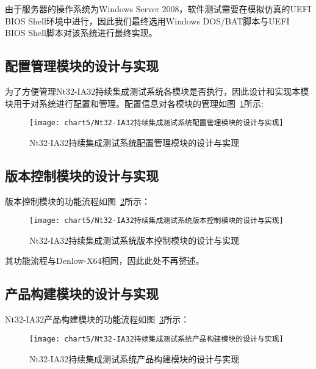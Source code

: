 	由于服务器的操作系统为Windows Server 2008，软件测试需要在模拟仿真的UEFI BIOS Shell环境中进行，因此我们最终选用Windows DOS/BAT脚本与UEFI BIOS Shell脚本对该系统进行最终实现。
		
	\subsection{配置管理模块的设计与实现}
		
		为了方便管理Nt32-IA32持续集成测试系统各模块是否执行，因此设计和实现本模块用于对系统进行配置和管理。配置信息对各模块的管理如图~\ref{fig:Nt32-IA32持续集成测试系统配置管理模块的设计与实现}所示:
	
		\begin{figure}[H] %
			\centering
			\texttt{[image: chart5/Nt32-IA32持续集成测试系统配置管理模块的设计与实现]}
			\caption{Nt32-IA32持续集成测试系统配置管理模块的设计与实现}
			\label{fig:Nt32-IA32持续集成测试系统配置管理模块的设计与实现}
		\end{figure}
	
	\subsection{版本控制模块的设计与实现}
		
		版本控制模块的功能流程如图~\ref{fig:Nt32-IA32持续集成测试系统版本控制模块的设计与实现}所示：
		
		\begin{figure}[H] %
			\centering
			\texttt{[image: chart5/Nt32-IA32持续集成测试系统版本控制模块的设计与实现]}
			\caption{Nt32-IA32持续集成测试系统版本控制模块的设计与实现}
			\label{fig:Nt32-IA32持续集成测试系统版本控制模块的设计与实现}
		\end{figure}

		其功能流程与Denlow-X64相同，因此此处不再赘述。
	
	\subsection{产品构建模块的设计与实现}
		
		Nt32-IA32产品构建模块的功能流程如图~\ref{fig:Nt32-IA32持续集成测试系统产品构建模块的设计与实现}所示：
		
		\begin{figure}[H] %
			\centering
			\texttt{[image: chart5/Nt32-IA32持续集成测试系统产品构建模块的设计与实现]}
			\caption{Nt32-IA32持续集成测试系统产品构建模块的设计与实现}
			\label{fig:Nt32-IA32持续集成测试系统产品构建模块的设计与实现}
		\end{figure}
		
